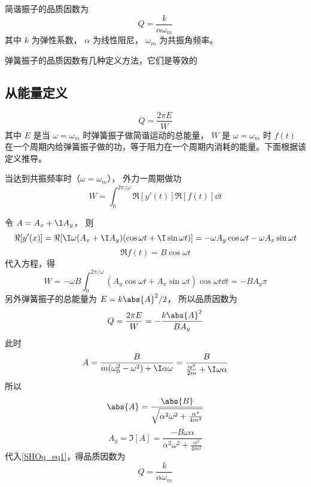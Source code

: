 

简谐振子的品质因数为
\begin{equation}
Q = \frac{k}{\alpha \omega_m}
\end{equation}
其中 $k$ 为弹性系数， $\alpha$ 为线性阻尼， $\omega_m$ 为共振角频率。

弹簧振子的品质因数有几种定义方法，它们是等效的

\subsection{从能量定义}
\begin{equation}
Q = \frac{2\pi E}{W}
\end{equation}
其中 $E$ 是当 $\omega = \omega_m$ 时弹簧振子做简谐运动的总能量， $W$ 是 $\omega = \omega_m$ 时 $f(t)$ 在一个周期内给弹簧振子做的功，等于阻力在一个周期内消耗的能量。下面根据该定义推导。

当达到共振频率时（$\omega = \omega_m$）， 外力一周期做功
\begin{equation}
W = \int_0^{2\pi/\omega} \Re[y'(t)] \Re[f(t)] \dd{t}
\end{equation}

令 $A = A_x + \I A_y$， 则
\begin{equation}
\Re[y'(x)] = \Re[\I\omega (A_x + \I A_y)(\cos\omega t + \I \sin\omega t)] = -\omega A_y \cos\omega t - \omega A_x \sin\omega t
\end{equation}
\begin{equation}
\Re f(t) = B\cos \omega t
\end{equation}
代入方程，得
\begin{equation}
W = -\omega B \int_0^{2\pi/\omega} (A_y \cos\omega t + A_x \sin\omega t) \cos\omega t \dd{t} = -B A_y \pi
\end{equation}
另外弹簧振子的总能量为 $E = k\abs{A}^2/2$， 所以品质因数为
\begin{equation}\label{SHOq_eq1}
Q = \frac{2\pi E}{W} = -\frac{k\abs{A}^2}{B A_y}
\end{equation}
此时
\begin{equation}
A = \frac{B}{m(\omega_0^2 - \omega^2) + \I \alpha\omega} = \frac{B}{\frac{\alpha^2}{2m} + \I\omega \alpha}
\end{equation}
所以
\begin{equation}
\abs{A} = \frac{\abs{B}}{\sqrt{\alpha^2\omega^2 + \frac{\alpha^4}{4m^2}}}
\end{equation}
\begin{equation}
A_y = \Im[A] = \frac{-B\omega\alpha}{\alpha^2\omega^2 + \frac{\alpha^2}{4m^2}}
\end{equation}
代入\autoref{SHOq_eq1}，得品质因数为
\begin{equation}
Q = \frac{k}{\alpha\omega_m}
\end{equation}


